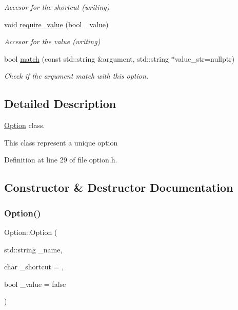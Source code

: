 \begin{DoxyCompactItemize}
\begin{DoxyCompactList}\small\item\em Accesor for the shortcut (writing) \end{DoxyCompactList}\item 
void \hyperlink{class_option_ab9ebb3871e3998d2d6ae7014606ad85e}{require\+\_\+value} (bool \+\_\+value)
\begin{DoxyCompactList}\small\item\em Accesor for the value (writing) \end{DoxyCompactList}\item 
bool \hyperlink{class_option_a261ccd60f0317b0e7a37ebd25e79bc9a}{match} (const std\+::string \&argument, std\+::string $\ast$value\+\_\+str=nullptr)
\begin{DoxyCompactList}\small\item\em Check if the argument match with this option. \end{DoxyCompactList}\end{DoxyCompactItemize}


\subsection{Detailed Description}
\hyperlink{class_option}{Option} class. 

This class represent a unique option 

Definition at line 29 of file option.\+h.



\subsection{Constructor \& Destructor Documentation}
\hypertarget{class_option_a686af13adc828fe688e097c531816e58}{}\label{class_option_a686af13adc828fe688e097c531816e58} 
\subsubsection{\texorpdfstring{Option()}{Option()}}
{\footnotesize\ttfamily Option\+::\+Option (\begin{DoxyParamCaption}\item[{std\+::string}]{\+\_\+name,  }\item[{char}]{\+\_\+shortcut = {},  }\item[{bool}]{\+\_\+value = {\ttfamily false} }\end{DoxyParamCaption})}



